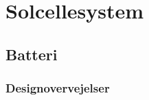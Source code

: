 \documentclass[../main.tex]{subfiles}
\begin{document}
\chapter{Solcellesystem} \label{Chap:Solcellesystem}

\section{Batteri}

\subsection{Designovervejelser}
\end{document}
